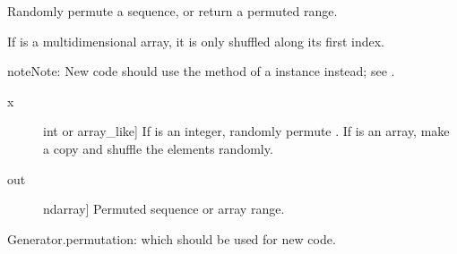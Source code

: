 \documentclass[letterpaper,10pt,english]{sphinxmanual}
\begin{document}
\begin{fulllineitems}
\label{\detokenize{infrapy.utils:infrapy.utils.ref2sac.permutation}}
Randomly permute a sequence, or return a permuted range.

If  is a multi\sphinxhyphen{}dimensional array, it is only shuffled along its
first index.

\begin{sphinxadmonition}{note}{Note:}
New code should use the  method of a 
instance instead; see .
\end{sphinxadmonition}
\begin{description}
\item[{x}] \leavevmode{[}int or array\_like{]}
If  is an integer, randomly permute .
If  is an array, make a copy and shuffle the elements
randomly.

\end{description}
\begin{description}
\item[{out}] \leavevmode{[}ndarray{]}
Permuted sequence or array range.

\end{description}

Generator.permutation: which should be used for new code.

\begin{sphinxVerbatim}[commandchars=\\\{\}]
\end{sphinxVerbatim}

\begin{sphinxVerbatim}[commandchars=\\\{\}]
\PYG{p}{[}    \PYG{p}{]}
\end{sphinxVerbatim}


\end{fulllineitems}
\end{document}
